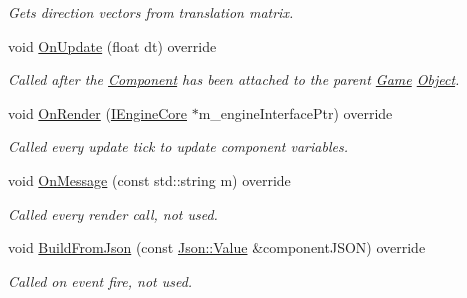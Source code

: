 \begin{DoxyCompactItemize}
\begin{DoxyCompactList}\small\item\em Gets direction vectors from translation matrix. \end{DoxyCompactList}\item 
void \hyperlink{class_camera_component_aa0391037fd478ea1a602835ea64091ba}{On\+Update} (float dt) override
\begin{DoxyCompactList}\small\item\em Called after the \hyperlink{class_component}{Component} has been attached to the parent \hyperlink{class_game}{Game} \hyperlink{class_object}{Object}. \end{DoxyCompactList}\item 
\hypertarget{class_camera_component_a4ef61a586b2c0a3e975150263d31d68b}{void \hyperlink{class_camera_component_a4ef61a586b2c0a3e975150263d31d68b}{On\+Render} (\hyperlink{class_i_engine_core}{I\+Engine\+Core} $\ast$m\+\_\+engine\+Interface\+Ptr) override}\label{class_camera_component_a4ef61a586b2c0a3e975150263d31d68b}

\begin{DoxyCompactList}\small\item\em Called every update tick to update component variables. \end{DoxyCompactList}\item 
\hypertarget{class_camera_component_a1cd7e6036568be5bf45d249d8f96a596}{void \hyperlink{class_camera_component_a1cd7e6036568be5bf45d249d8f96a596}{On\+Message} (const std\+::string m) override}\label{class_camera_component_a1cd7e6036568be5bf45d249d8f96a596}

\begin{DoxyCompactList}\small\item\em Called every render call, not used. \end{DoxyCompactList}\item 
void \hyperlink{class_camera_component_ae356a12312239d399984ac5b5aaa7adf}{Build\+From\+Json} (const \hyperlink{class_json_1_1_value}{Json\+::\+Value} \&component\+J\+S\+O\+N) override
\begin{DoxyCompactList}\small\item\em Called on event fire, not used. \end{DoxyCompactList}\end{DoxyCompactItemize}

